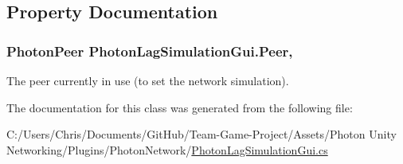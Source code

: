 \subsection{Property Documentation}
\subsubsection[{\texorpdfstring{Peer}{Peer}}]{\setlength{\rightskip}{0pt plus 5cm}Photon\+Peer Photon\+Lag\+Simulation\+Gui.\+Peer\hspace{0.3cm}{\ttfamily [get]}, {\ttfamily [set]}}\hypertarget{class_photon_lag_simulation_gui_ad6ae62fc67cdb2936b13029ec7c68d64}{}\label{class_photon_lag_simulation_gui_ad6ae62fc67cdb2936b13029ec7c68d64}


The peer currently in use (to set the network simulation).



The documentation for this class was generated from the following file\+:\begin{DoxyCompactItemize}
\item 
C\+:/\+Users/\+Chris/\+Documents/\+Git\+Hub/\+Team-\/\+Game-\/\+Project/\+Assets/\+Photon Unity Networking/\+Plugins/\+Photon\+Network/\hyperlink{_photon_lag_simulation_gui_8cs}{Photon\+Lag\+Simulation\+Gui.\+cs}\end{DoxyCompactItemize}
